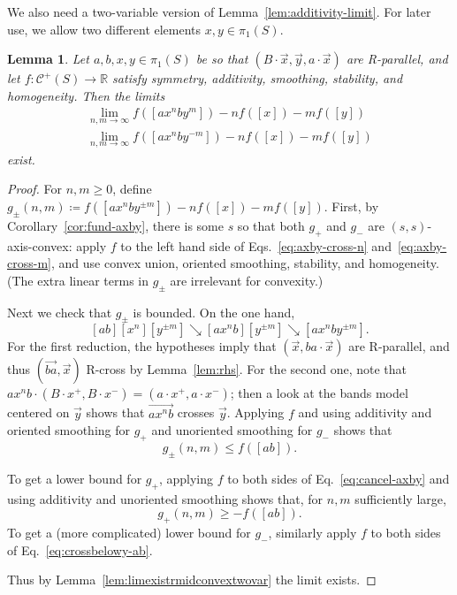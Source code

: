 \documentclass[11pt]{amsart}
\newcommand{\ora}[1]{\overrightarrow{#1}}
\numberwithin{equation}{section}
\numberwithin{figure}{section}
\newtheorem{lemma}[theorem]{Lemma}
\theoremstyle{definition}
\theoremstyle{plain}
\newcommand\bbR{\ensuremath{\mathbb{R}}}
\newcommand{\Curves}{\mathcal{C}}
\newcommand{\reducesto}{\mathrel{\searrow}}
\begin{document}
We also need a two-variable version of
Lemma~\ref{lem:additivity-limit}. For later use, we allow two
different elements $x,y \in \pi_1(S)$.
\begin{lemma}\label{lem:additivity-limit-2}
  Let $a,b,x,y \in \pi_1(S)$ be so that
  $(B \cdot \ora{x}, \ora{y}, a \cdot \ora{x})$ are R-parallel, and
  let $f \colon \Curves^+(S) \to \bbR$ satisfy symmetry, additivity, smoothing,
  stability, and homogeneity. Then the limits
  \begin{gather*}
    \lim_{n,m \to \infty} f([ax^nby^m]) - nf([x]) - mf([y])\\
    \lim_{n,m \to \infty} f([ax^nby^{-m}]) - nf([x]) - mf([y])
  \end{gather*}
  exist.
\end{lemma}
\begin{proof}
  For $n,m \ge 0$, define $g_
  {\pm}(n,m) \coloneqq f([ax^nby^{\pm m}]) - nf([x]) - mf([y])$. First,
  by Corollary~\ref{cor:fund-axby}, there is some $s$ so that both
  $g_+$ and $g_-$
  are $(s,s)$-axis-convex: apply $f$ to the left hand side of
  Eqs.~\eqref{eq:axby-cross-n} and~\eqref{eq:axby-cross-m}, and use
  convex union, oriented smoothing, stability, and homogeneity. (The extra
  linear terms in $g_{\pm}$ are irrelevant for convexity.)

  Next we check that $g_{\pm}$ is bounded.
  On the one hand,
  \[
    [ab][x^n][y^{\pm m}] \reducesto [ax^nb][y^{\pm m}] \reducesto [ax^nby^{\pm m}].
  \]
  For the first reduction, the hypotheses imply that
  $(\ora{x}, ba\cdot\ora{x})$ are R-parallel, and thus $(\ora{ba},\ora{x})$ R-cross by Lemma~\ref{lem:rhs}. For the second one, note
  that
  $ax^n b\cdot(B\cdot x^+, B\cdot x^-) = (a\cdot x^+, a\cdot x^-)$;
  then a look at the bands model centered on $\ora{y}$ shows that
  $\ora{a x^n b}$ crosses $\ora{y}$.   Applying $f$ and using additivity
  and oriented smoothing for $g_+$ and unoriented smoothing for $g_-$ shows that
  \[
    g_{\pm}(n,m) \le f([ab]).
  \]

  To get a lower bound for $g_+$, applying $f$ to both sides of
  Eq.~\eqref{eq:cancel-axby} and using additivity and unoriented smoothing shows
  that, for $n, m$ sufficiently large,
  \[
    g_+(n,m) \ge -f([ab]).
  \]
 To get a (more complicated) lower bound for $g_-$, similarly apply $f$ to both sides of
 Eq.~\eqref{eq:crossbelowy-ab}.

   Thus by
   Lemma~\ref{lem:limexistrmidconvextwovar} the limit exists.
\end{proof}
\end{document}

